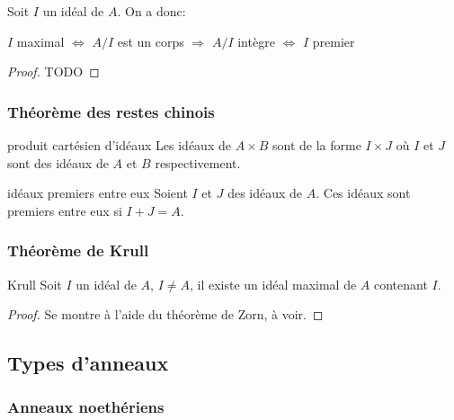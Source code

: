 \begin{proposition}{}{}
    Soit $I$ un idéal de $A$. On a donc:
    \begin{center}
        $I$ maximal $\Longleftrightarrow$ $A/I$ est un corps $\Longrightarrow$ $A/I$ intègre $\Longleftrightarrow$ $I$ premier
    \end{center}
\end{proposition}

\begin{proof}
    TODO
\end{proof}

\subsubsection{Théorème des restes chinois}

\begin{proposition}{produit cartésien d'idéaux}{}
    Les idéaux de $A \times B$ sont de la forme $I \times J$ 
    où $I$ et $J$ sont des idéaux de $A$ et $B$ respectivement. 
\end{proposition}

\begin{proposition}{idéaux premiers entre eux}{}
    Soient $I$ et $J$ des idéaux de $A$. Ces idéaux sont premiers entre eux si $I + J = A$.
    
\end{proposition}

\subsubsection{Théorème de Krull}

\begin{theorem}{Krull}{}
    Soit $I$ un idéal de $A$, $I \neq A$, il existe un idéal maximal de $A$ contenant $I$.
\end{theorem}

\begin{proof}
    Se montre à l'aide du théorème de Zorn, à voir.
\end{proof}




\subsection{Types d'anneaux}

\subsubsection{Anneaux noethériens}

